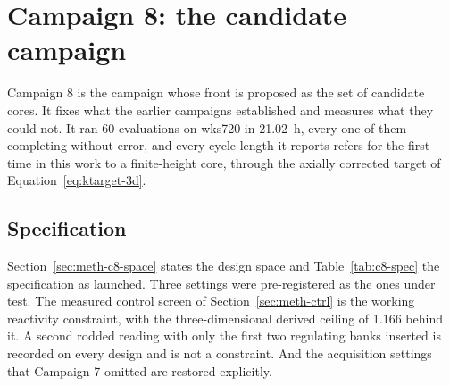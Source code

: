 %
%

\section{Campaign 8: the candidate campaign}
\label{sec:res-c8}

Campaign 8 is the campaign whose front is proposed as the set of
candidate cores. It fixes what the earlier campaigns established and
measures what they could not. It ran 60 evaluations on wks720 in
\SI{21.02}{h}, every one of them completing without error, and every
cycle length it reports refers for the first time in this work to a
finite-height core, through the axially corrected target of
Equation~\eqref{eq:ktarget-3d}.

\subsection{Specification}
\label{sec:res-c8-intent}

Section~\ref{sec:meth-c8-space} states the design space and
Table~\ref{tab:c8-spec} the specification as launched. Three settings
were pre-registered as the ones under test. The measured control screen
of Section~\ref{sec:meth-ctrl} is the working reactivity constraint,
with the three-dimensional derived ceiling of 1.166 behind it. A second
rodded reading with only the first two regulating banks inserted is
recorded on every design and is not a constraint. And the acquisition
settings that Campaign 7 omitted are restored explicitly.

